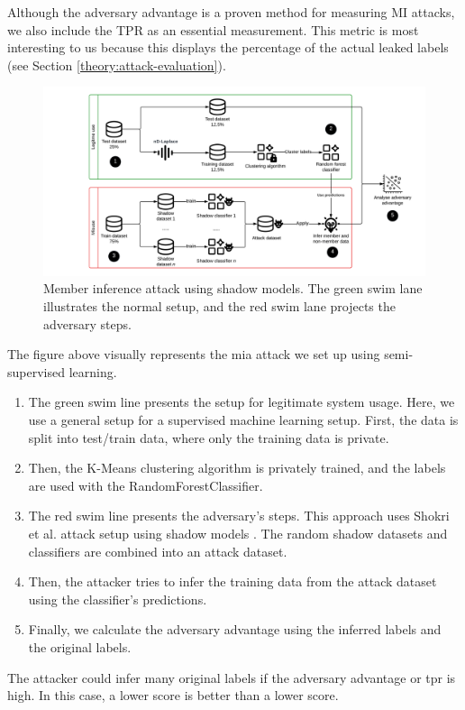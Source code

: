\begin{enumerate}
        Although the adversary advantage is a proven method for measuring MI attacks, we also include the TPR as an essential measurement.
        This metric is most interesting to us because this displays the percentage of the actual leaked labels (see Section \ref{theory:attack-evaluation}).
        \begin{figure}[H]
          \includegraphics[width=1.1\textwidth]{Method/images/MI-setup.png}
          \caption{Member inference attack using shadow models. The green swim lane illustrates the normal setup, and the red swim lane projects the adversary steps.}
          \label{figure:mi-attack}
        \end{figure}
        The figure above visually represents the \gls{mia} attack we set up using semi-supervised learning.
        \begin{enumerate}
          \item The green swim line presents the setup for legitimate system usage.
                Here, we use a general setup for a supervised machine learning setup.
                First, the data is split into test/train data, where only the training data is private.
          \item Then, the K-Means clustering algorithm is privately trained, and the labels are used with the RandomForestClassifier.
          \item The red swim line presents the adversary's steps.
                This approach uses Shokri et al. attack setup using shadow models \citep{shokri_membership_2017}.
                The random shadow datasets and classifiers are combined into an attack dataset.
          \item Then, the attacker tries to infer the training data from the attack dataset using the classifier's predictions.
          \item Finally, we calculate the adversary advantage using the inferred labels and the original labels.
        \end{enumerate}
        The attacker could infer many original labels if the adversary advantage or \gls{tpr} is high.
        In this case, a lower score is better than a lower score.
\end{enumerate}
%
